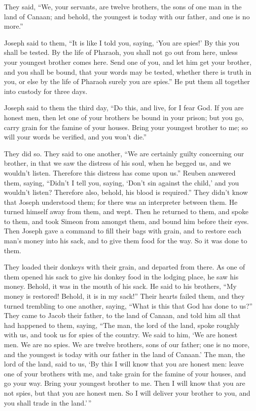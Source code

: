  They said, ``We, your servants, are twelve brothers, the
sons of one man in the land of Canaan; and behold, the youngest is today
with our father, and one is no more.''

 Joseph said to them, ``It is like I told you, saying, `You
are spies!'  By this you shall be tested. By the life of
Pharaoh, you shall not go out from here, unless your youngest brother
comes here.  Send one of you, and let him get your brother,
and you shall be bound, that your words may be tested, whether there is
truth in you, or else by the life of Pharaoh surely you are spies.''
 He put them all together into custody for three days.

 Joseph said to them the third day, ``Do this, and live,
for I fear God.  If you are honest men, then let one of
your brothers be bound in your prison; but you go, carry grain for the
famine of your houses.  Bring your youngest brother to me;
so will your words be verified, and you won't die.''

They did so.  They said to one another, ``We are certainly
guilty concerning our brother, in that we saw the distress of his soul,
when he begged us, and we wouldn't listen. Therefore this distress has
come upon us.''  Reuben answered them, saying, ``Didn't I
tell you, saying, `Don't sin against the child,' and you wouldn't
listen? Therefore also, behold, his blood is required.'' 
They didn't know that Joseph understood them; for there was an
interpreter between them.  He turned himself away from
them, and wept. Then he returned to them, and spoke to them, and took
Simeon from amongst them, and bound him before their eyes. 
Then Joseph gave a command to fill their bags with grain, and to restore
each man's money into his sack, and to give them food for the way. So it
was done to them.

 They loaded their donkeys with their grain, and departed
from there.  As one of them opened his sack to give his
donkey food in the lodging place, he saw his money. Behold, it was in
the mouth of his sack.  He said to his brothers, ``My money
is restored! Behold, it is in my sack!'' Their hearts failed them, and
they turned trembling to one another, saying, ``What is this that God
has done to us?''  They came to Jacob their father, to the
land of Canaan, and told him all that had happened to them, saying,
 ``The man, the lord of the land, spoke roughly with us,
and took us for spies of the country.  We said to him, `We
are honest men. We are no spies.  We are twelve brothers,
sons of our father; one is no more, and the youngest is today with our
father in the land of Canaan.'  The man, the lord of the
land, said to us, `By this I will know that you are honest men: leave
one of your brothers with me, and take grain for the famine of your
houses, and go your way.  Bring your youngest brother to
me. Then I will know that you are not spies, but that you are honest
men. So I will deliver your brother to you, and you shall trade in the
land.'\,''

